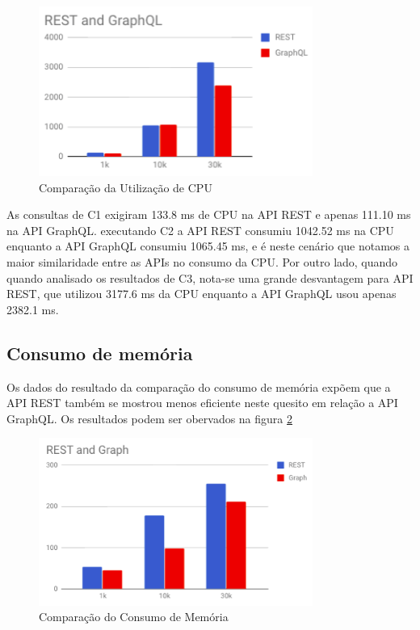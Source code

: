\begin{figure}[htbp]
    \centering
    \includegraphics[width=0.8\textwidth]{figuras/q1-cpu.png}
    \caption{Comparação da Utilização de CPU}
    \label{fig:q1-cpu}
    \author{fonte: Autor}
\end{figure}

As consultas de C1 exigiram 133.8 ms de CPU na API REST e apenas 111.10 ms na API GraphQL. executando C2 a API REST consumiu 1042.52 ms na CPU enquanto a API GraphQL consumiu 1065.45 ms, e é neste cenário que notamos a maior similaridade entre as APIs no consumo da CPU. Por outro lado, quando quando analisado os resultados de C3, nota-se uma grande desvantagem para API REST, que utilizou 3177.6 ms da CPU enquanto a API GraphQL usou apenas 2382.1 ms.
    
\subsection{Consumo de memória}

Os dados do resultado da comparação do consumo de memória expõem que a API REST também se mostrou menos eficiente neste quesito em relação a API GraphQL. Os resultados podem ser obervados na figura \ref{fig:q1-mem}

\begin{figure}[htbp]
    \centering
    \includegraphics[width=0.8\textwidth]{figuras/q1-mem.png}
    \caption{Comparação do Consumo de Memória}
    \label{fig:q1-mem}
    \author{fonte: Autor}
\end{figure}

